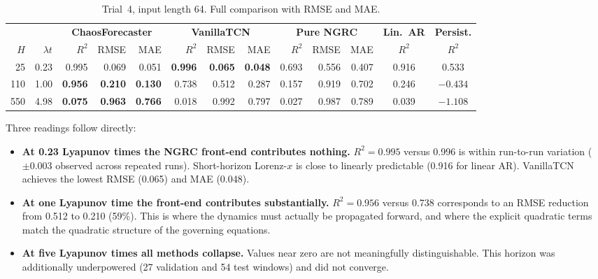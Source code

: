 \documentclass[11pt,a4paper]{article}
\begin{document}
\begin{table}[H]
\centering
\caption{Trial~4, input length 64. Full comparison with RMSE and MAE.}
\label{tab:trial4}
\begin{tabular}{rr|rrr|rrr|rrr|c|c}
\toprule
 & & \multicolumn{3}{c|}{\textbf{ChaosForecaster}} & \multicolumn{3}{c|}{\textbf{VanillaTCN}} & \multicolumn{3}{c|}{\textbf{Pure NGRC}} & \textbf{Lin.\ AR} & \textbf{Persist.} \\
$H$ & $\lambda t$ & $R^2$ & RMSE & MAE & $R^2$ & RMSE & MAE & $R^2$ & RMSE & MAE & $R^2$ & $R^2$ \\
\midrule
25  & 0.23 & 0.995 & 0.069 & 0.051 & \textbf{0.996} & \textbf{0.065} & \textbf{0.048} & 0.693 & 0.556 & 0.407 & 0.916 & 0.533 \\
110 & 1.00 & \textbf{0.956} & \textbf{0.210} & \textbf{0.130} & 0.738 & 0.512 & 0.287 & 0.157 & 0.919 & 0.702 & 0.246 & $-0.434$ \\
550 & 4.98 & \textbf{0.075} & \textbf{0.963} & \textbf{0.766} & 0.018 & 0.992 & 0.797 & 0.027 & 0.987 & 0.789 & 0.039 & $-1.108$ \\
\bottomrule
\end{tabular}
\end{table}

Three readings follow directly:

\begin{itemize}[leftmargin=*]
  \item \textbf{At 0.23 Lyapunov times the NGRC front-end contributes nothing.}
    $R^2 = 0.995$ versus 0.996 is within run-to-run variation ($\pm 0.003$ observed across repeated runs).
    Short-horizon Lorenz-$x$ is close to linearly predictable (0.916 for linear AR).
    VanillaTCN achieves the lowest RMSE (0.065) and MAE (0.048).

  \item \textbf{At one Lyapunov time the front-end contributes substantially.}
    $R^2 = 0.956$ versus 0.738 corresponds to an RMSE reduction from 0.512 to 0.210 (59\%).
    This is where the dynamics must actually be propagated forward, and where the explicit quadratic terms match the quadratic structure of the governing equations.

  \item \textbf{At five Lyapunov times all methods collapse.}
    Values near zero are not meaningfully distinguishable.
    This horizon was additionally underpowered (27 validation and 54 test windows) and did not converge.
\end{itemize}
\end{document}
